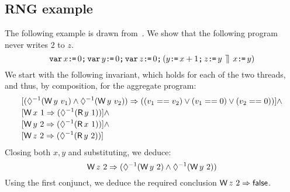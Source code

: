 \subsection{RNG example}
The following example is drawn from~\citet{DBLP:conf/lics/JeffreyR16,DBLP:conf/esop/SvendsenPDLV18}.  We show that the following program never writes $2$ to $z$. 
\begin{displaymath}
  \VAR x\GETS0\SEMI \VAR y\GETS0\SEMI \VAR z\GETS0\SEMI  %
  (
    y\GETS x+1\SEMI z \GETS y
  \PAR
    x\GETS y
  )
\end{displaymath}
We start with the following invariant, which holds for each of the two threads, and thus, by composition, for the aggregate program:
\begin{align*}
  &[(\once(\DW{y}{v_1}) \land \once(\DW{y}{v_2})) \Rightarrow ((v_1 == v_2) \vee (v_1 == 0) \vee (v_2 == 0))] \land\\[-.5ex]
  &[\DW{x}{1} \Rightarrow (\once(\DR{y}{1}))] \land \\[-.5ex]
  &[\DW{y}{2} \Rightarrow (\once(\DR{x}{1}))]  \land \\[-.5ex]
  &[\DW{z}{2} \Rightarrow (\once(\DR{y}{2}))]
\end{align*}
Closing both $x,y$ and substituting, we deduce:
\[ \DW{z}{2} \Rightarrow (\once(\DW{y}{2})  \land \once(\DW{y}{2})) \]
Using the first conjunct, we deduce the required conclusion $\DW{z}{2} \Rightarrow \FALSE$. 



\endinput

\begin{verbatim}



y=x+1; a=y || x=y
prove a!=2

Wyv_1 /\ Wyv_2 => v_1 == v_2 (and maybe v_1==0 \/ v_2==0)
Wx1 => <>-1 Ry1
Wy1 => <>-1 Rx1
\end{verbatim}

